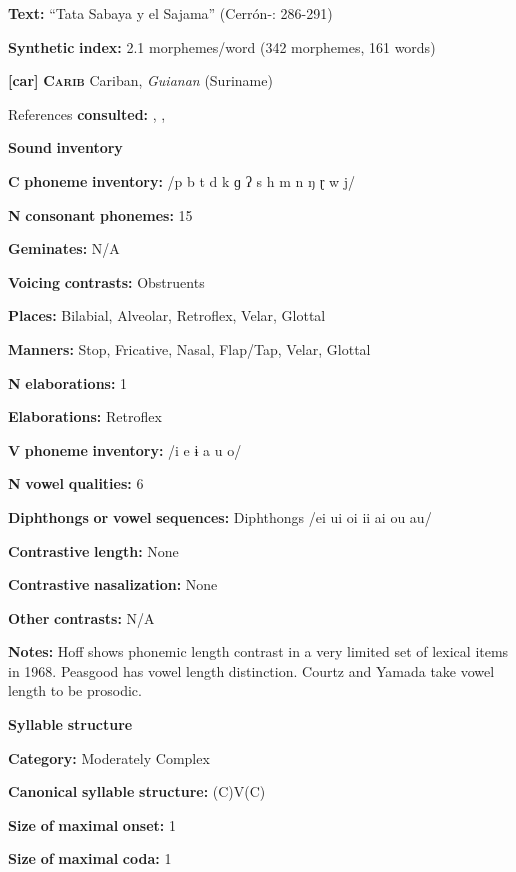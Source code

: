 \textbf{Text:} “Tata Sabaya y el Sajama” (Cerrón-\citealt{Palomino2006}: 286-291)

\textbf{Synthetic} \textbf{index:} 2.1 morphemes/word (342 morphemes, 161 words)

\textbf{[car]}   \textbf{\textsc{Carib}  }  Cariban, \textit{Guianan} (Suriname)

References \textbf{consulted:} \citet{Courtz2008}, \citet{Hoff1968}, \citet{Peasgood1972}

\textbf{Sound} \textbf{inventory}

\textbf{C} \textbf{phoneme} \textbf{inventory:} /p b t d k ɡ ʔ s h m n ŋ ɽ w j/

\textbf{N} \textbf{consonant} \textbf{phonemes:} 15

\textbf{Geminates:} N/A

\textbf{Voicing} \textbf{contrasts:} Obstruents

\textbf{Places:} Bilabial, Alveolar, Retroflex, Velar, Glottal

\textbf{Manners:} Stop, Fricative, Nasal, Flap/Tap, Velar, Glottal

\textbf{N} \textbf{elaborations:} 1

\textbf{Elaborations:} Retroflex

\textbf{V} \textbf{phoneme} \textbf{inventory:} /i e ɨ a u o/

\textbf{N} \textbf{vowel} \textbf{qualities:} 6

\textbf{Diphthongs} \textbf{or} \textbf{vowel} \textbf{sequences:} Diphthongs /ei ui oi ii ai ou au/

\textbf{Contrastive} \textbf{length:} None

\textbf{Contrastive} \textbf{nasalization:} None

\textbf{Other} \textbf{contrasts:} N/A

\textbf{Notes:} Hoff shows phonemic length contrast in a very limited set of lexical items in 1968. Peasgood has vowel length distinction. Courtz and Yamada take vowel length to be prosodic.

\textbf{Syllable} \textbf{structure}

\textbf{Category:} Moderately Complex

\textbf{Canonical} \textbf{syllable} \textbf{structure:} (C)V(C) \citep[22-7]{Courtz2008}

\textbf{Size} \textbf{of} \textbf{maximal} \textbf{onset:} 1

\textbf{Size} \textbf{of} \textbf{maximal} \textbf{coda:} 1

